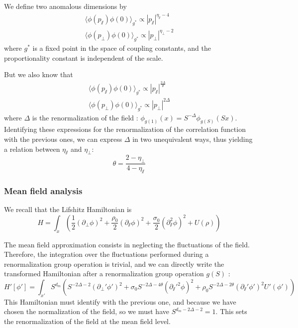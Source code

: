 We define two anomalous dimensions by
\begin{align}
\langle \phi(p_\sslash) \phi(0) \rangle_{g^*} \propto |p_\sslash|^{\eta_\sslash -4} \\
\langle \phi(p_\perp) \phi(0) \rangle_{g^*} \propto |p_\perp|^{\eta_\perp -2} 
\end{align}
where $g^*$ is a fixed point in the space of coupling constants, and the proportionality constant is independent of the scale.

But we also know that
\begin{align}
\langle \phi(p_\sslash) \phi(0) \rangle_{g^*} \propto |p_\sslash|^{\frac{2 \Delta}{\theta}} \\
\langle \phi(p_\perp) \phi(0) \rangle_{g^*} \propto |p_\perp|^{2\Delta} 
\end{align}
where $\Delta$ is the renormalization of the field : $\phi_{g(1)}(x) = S^{-\Delta} \phi_{g(S)}(Sx)$. 
Identifying these expressions for the renormalization of the correlation function with the previous ones, we can express $\Delta$ in two unequivalent ways, thus yielding a relation between $\eta_\sslash$ and $\eta_\perp$:
\begin{equation}
\theta = \frac{2- \eta_\perp}{4- \eta_\sslash}
\end{equation}

\subsubsection{Mean field analysis}

We recall that the Lifshitz Hamiltonian is
\begin{equation}
H = \int_x \left( \frac{1}{2}(\partial_\perp \phi)^2 + \frac{\rho_0}{2} (\partial_\sslash \phi)^2 + \frac{\sigma_0}{2} (\partial_\sslash^2 \phi)^2 + U(\rho) \right)
\end{equation}

The mean field approximation consists in neglecting the fluctuations of the field. Therefore, the integration over the fluctuations performed during a renormalization group operation is trivial, and we can directly write the transformed Hamiltonian after a renormalization group operation $g(S)$ :
\begin{equation}
H'[\phi'] = \int_{x'} S^{d_m} \left( S^{-2\Delta -2} (\partial_\perp' \phi')^2 + \sigma_0 S^{-2\Delta - 4 \theta} (\partial_\sslash'^2 \phi)^2 + \rho_0 S^{-2\Delta -2 \theta} (\partial_\sslash' \phi')^2 U'(\phi') \right)
\end{equation}
This Hamiltonian must identify with the previous one, and because we have chosen the normalization of the field, so we must have $S^{d_m-2\Delta -2} =1$. This sets the renormalization of the field at the mean field level.

